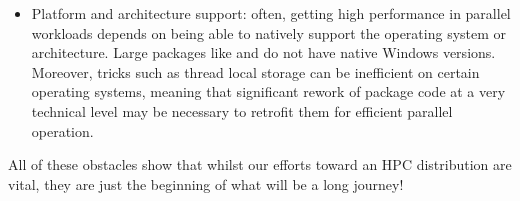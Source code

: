 \documentclass{deliverablereport}
\begin{document}
\begin{itemize}
\item Platform and architecture support: often, getting high performance in parallel workloads depends on
  being able to natively support the operating system or architecture. Large packages like \GAP and \Singular
  do not have native Windows versions. Moreover, tricks such as thread local storage can be inefficient on
  certain operating systems, meaning that significant rework of package code at a very technical level may
  be necessary to retrofit them for efficient parallel operation.
\end{itemize}

All of these obstacles show that whilst our efforts toward an HPC \Sage distribution are vital, they are
just the beginning of what will be a long journey!



\end{document}
